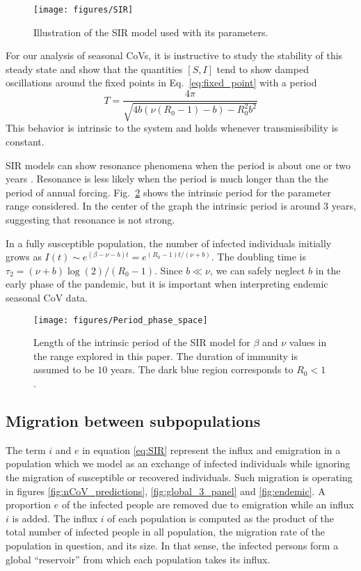 \documentclass[rmp, reprint, superscriptaddress, floatfix,amsmath]{revtex4-1}
\begin{document}
\begin{figure}[htb]
	\centering
	\texttt{[image: figures/SIR]}
	\caption{Illustration of the SIR model used with its parameters.}\label{fig:schemeSIR}
\end{figure}


For our analysis of seasonal CoVs, it is instructive to study the stability of this steady state and show that the quantities $[S,I]$ tend to show damped oscillations around the fixed points in Eq.~\ref{eq:fixed_point} with a period
\begin{equation}
T = \frac{4\pi}{\sqrt{4b(\nu(R_0-1) - b) - R_0^2b^2}}
\label{eq:period}
\end{equation}
This behavior is intrinsic to the system and holds whenever transmissibility is constant.

SIR models can show resonance phenomena when the period is about one or two years \citep{dushoff_dynamical_2004,chen_regular_2017}.
Resonance is less likely when the period is much longer than the the period of annual forcing.
Fig.~\ref{fig:intrinsicPeriod} shows the intrinsic period for the parameter range considered. 
In the center of the graph the intrinsic period is around 3 years, suggesting that resonance is not strong.

In a fully susceptible population, the number of infected individuals initially grows as $I(t)\sim e^{(\beta-\nu-b)t} = e^{(R_0-1)t/(\nu+b)}$.
The doubling time is $\tau_2 = (\nu+b)\log(2)/(R_0-1)$.
Since $b\ll \nu$, we can safely neglect $b$ in the early phase of the pandemic, but it is important when interpreting endemic seasonal CoV data. 


\begin{figure}[htb]
	\centering
	\texttt{[image: figures/Period\_phase\_space]}
	\caption{Length of the intrinsic period of the SIR model for $\beta$ and $\nu$ values in the range explored in this paper. The duration of immunity is assumed to be $10$ years. The dark blue region corresponds to $R_0<1$. }
	\label{fig:intrinsicPeriod}
\end{figure}


\subsection*{Migration between subpopulations}

The term $i$ and $e$ in equation \ref{eq:SIR} represent the influx and emigration in a population which we model as an exchange of infected individuals while ignoring the migration of susceptible or recovered individuals.
Such migration is operating in figures \ref{fig:nCoV_predictions}, \ref{fig:global_3_panel} and \ref{fig:endemic}. 
A proportion $e$ of the infected people are removed due to emigration while an influx $i$ is added.
The influx $i$ of each population is computed as the product of the total number of infected people in all population, the migration rate of the population in question, and its size. 
In that sense, the infected persons form a global ``reservoir'' from which each population takes its influx.
\end{document}
